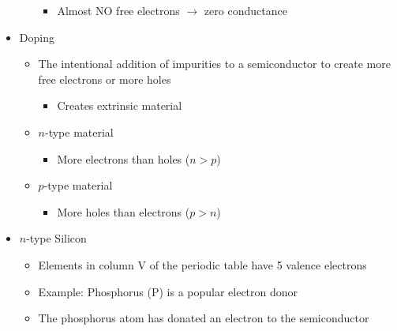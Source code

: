 \begin{itemize}
\begin{itemize}
\begin{itemize}
          \item Almost NO free electrons $\to$ zero conductance

        \end{itemize}

    \end{itemize}

  \item Doping

    \begin{itemize}

      \item The intentional addition of impurities to a semiconductor to create more free electrons or more holes

        \begin{itemize}

          \item Creates extrinsic material

        \end{itemize}

      \item $n$-type material

        \begin{itemize}

          \item More electrons than holes ($n>p$)

        \end{itemize}

      \item $p$-type material

        \begin{itemize}

          \item More holes than electrons ($p>n$)

        \end{itemize}

    \end{itemize}

  \item $n$-type Silicon

    \begin{itemize}

      \item Elements in column V of the periodic table have 5 valence electrons

      \item Example: Phosphorus (P) is a popular electron donor

      \item The phosphorus atom has donated an electron to the semiconductor


\end{itemize}
\end{itemize}
